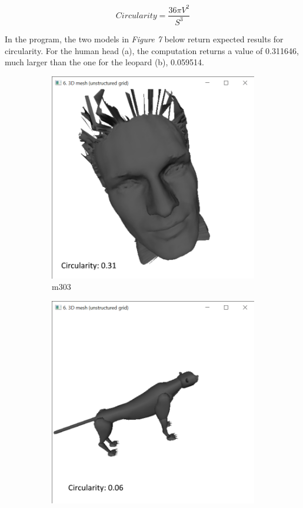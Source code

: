 \documentclass{bigdata}
\begin{document}
\begin{equation}
Circularity = \frac{36\pi V^2}{S^3}
\end{equation}

\noindent In the program, the two models in \textit{Figure 7} below return expected results for circularity. For the human head (a), the computation returns a value of 0.311646, much larger than the one for the leopard (b), 0.059514.

\begin{figure}[h!]
	\centering
	\begin{subfigure}[b]{0.35\linewidth}
		\includegraphics[width=\linewidth]{Pictures/Part3/circHead.png}
		\caption{m303}
	\end{subfigure}
	\begin{subfigure}[b]{0.35\linewidth}
		\includegraphics[width=\linewidth]{Pictures/Part3/circLeo.png}

\end{subfigure}
\end{figure}
\end{document}
